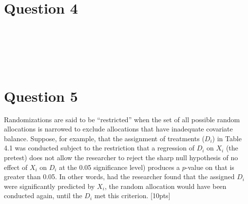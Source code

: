 \documentclass[11pt,notitlepage]{article}\usepackage[]{graphicx}\usepackage[]{color}
\makeatletter
\newenvironment{kframe}{%
 \def\at@end@of@kframe{}%
 \ifinner\ifhmode%
  \def\at@end@of@kframe{\end{minipage}}%
  \begin{minipage}{\columnwidth}%
 \fi\fi%
 \def\FrameCommand##1{\hskip\@totalleftmargin \hskip-\fboxsep
 \colorbox{shadecolor}{##1}\hskip-\fboxsep
     \hskip-\linewidth \hskip-\@totalleftmargin \hskip\columnwidth}%
 \MakeFramed {\advance\hsize-\width
   \@totalleftmargin\z@ \linewidth\hsize
   \@setminipage}}%
 {\par\unskip\endMakeFramed%
 \at@end@of@kframe}
\newenvironment{knitrout}{}{} %
\makeatother
\begin{document}
\section*{Question 4}

\begin{knitrout}
\color{fgcolor}\begin{kframe}
\begin{verbatim}






\end{verbatim}
\end{kframe}
\end{knitrout}


\section*{Question 5}


Randomizations are said to be ``restricted'' when the set of all possible random allocations is narrowed to exclude allocations that have inadequate covariate balance.  Suppose, for example, that the assignment of treatments ($D_i$) in Table 4.1 was conducted subject to the restriction that a regression of $D_i$ on $X_i$ (the pretest) does not allow the researcher to reject the sharp null hypothesis of no effect of $X_i$ on $D_i$ at the 0.05 significance level) produces a $p$-value on that is greater than 0.05. In other words, had the researcher found that the assigned $D_i$ were significantly predicted by $X_i$, the random allocation would have been conducted again, until the $D_i$ met this criterion. [10pts]
\end{document}
